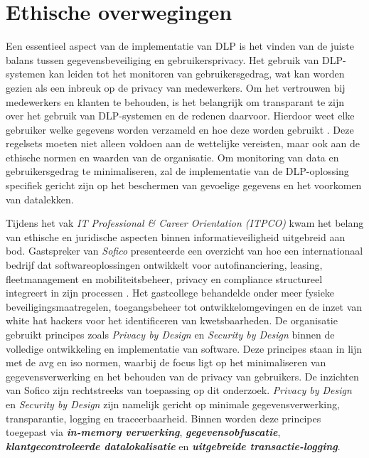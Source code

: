   

\section{Ethische overwegingen}%

Een essentieel aspect van de implementatie van DLP is het vinden van de juiste balans tussen gegevensbeveiliging en gebruikersprivacy. 
Het gebruik van DLP-systemen kan leiden tot het monitoren van gebruikersgedrag, wat kan worden gezien als een inbreuk op de privacy van medewerkers. 
Om het vertrouwen bij medewerkers en klanten te behouden, is het belangrijk om transparant te zijn over het gebruik van DLP-systemen en de redenen daarvoor. 
Hierdoor weet elke gebruiker welke gegevens worden verzameld en hoe deze worden gebruikt \autocite{Zaini2024}. 
Deze regelsets moeten niet alleen voldoen aan de wettelijke vereisten, maar ook aan de ethische normen en waarden van de organisatie. 
Om monitoring van data en gebruikersgedrag te minimaliseren, 
zal de implementatie van de DLP-oplossing specifiek gericht zijn op het beschermen van gevoelige gegevens en het voorkomen van datalekken. 

Tijdens het vak \textit{IT Professional \& Career Orientation (ITPCO)} kwam het belang van ethische en juridische aspecten binnen informatieveiligheid uitgebreid aan bod. 
Gastspreker \textcite{SoficoGuestLecture2024} van \textit{Sofico} presenteerde een overzicht van hoe een internationaal bedrijf dat softwareoplossingen ontwikkelt voor autofinanciering, 
leasing, fleetmanagement en mobiliteitsbeheer, privacy en compliance structureel integreert in zijn processen \autocite{SoficoGuestLecture2024}. 
Het gastcollege behandelde onder meer fysieke beveiligingsmaatregelen, toegangsbeheer tot ontwikkelomgevingen en de inzet van white hat hackers voor het identificeren van kwetsbaarheden.
De organisatie gebruikt principes zoals \textit{Privacy by Design} en \textit{Security by Design} binnen de volledige ontwikkeling en implementatie van software. 
Deze principes staan in lijn met de \gls{avg} en \gls{iso} normen, waarbij de focus ligt op het minimaliseren van gegevensverwerking en het behouden van de privacy van gebruikers.
De inzichten van Sofico zijn rechtstreeks van toepassing op dit onderzoek.
\textit{Privacy by Design} en \textit{Security by Design} zijn namelijk gericht op minimale gegevensverwerking, transparantie, logging en traceerbaarheid. 
Binnen \textcite{Netskope2024PrivByDesign} worden deze principes toegepast via \textit{\textbf{in-memory verwerking}}, \textit{\textbf{gegevensobfuscatie}}, \textit{\textbf{klantgecontroleerde datalokalisatie}} en \textit{\textbf{uitgebreide transactie-logging}}.

